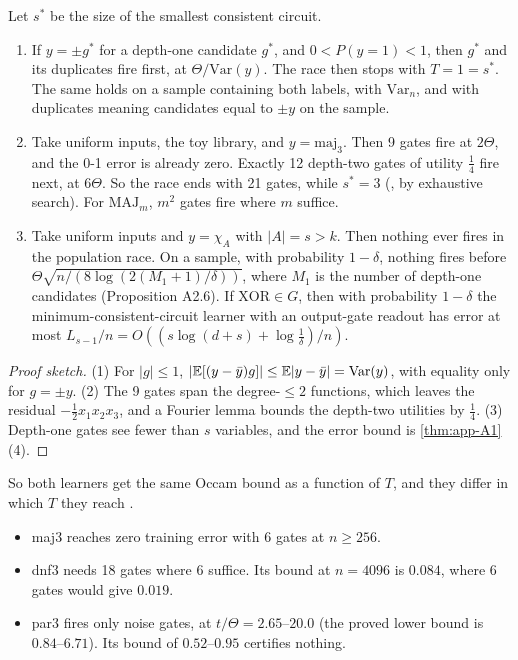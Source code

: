 \begin{proposition}\label{prop:app-A4}
\quad Let $s^*$ be the size of the smallest consistent circuit.
\begin{enumerate}[label=(\arabic*),nosep]
\item If $y=\pm g^*$ for a depth-one candidate $g^*$, and $0<P(y=1)<1$, then $g^*$ and its duplicates fire first, at $\Theta/\mathrm{Var}(y)$. The race then stops with $T=1=s^*$. The same holds on a sample containing both labels, with $\mathrm{Var}_n$, and with duplicates meaning candidates equal to $\pm y$ on the sample.
\item Take uniform inputs, the toy library, and $y=\mathrm{maj}_3$. Then 9 gates fire at $2\Theta$, and the 0-1 error is already zero. Exactly 12 depth-two gates of utility $\frac14$ fire next, at $6\Theta$. So the race ends with 21 gates, while $s^*=3$ (, by exhaustive search). For $\mathrm{MAJ}_m$, $m^2$ gates fire where $m$ suffice.
\item Take uniform inputs and $y=\chi_A$ with $|A|=s>k$. Then nothing ever fires in the population race. On a sample, with probability $1-\delta$, nothing fires before $\Theta\sqrt{n/(8\log(2(M_1+1)/\delta))}$, where $M_1$ is the number of depth-one candidates (Proposition A2.6). If $\mathrm{XOR}\in G$, then with probability $1-\delta$ the minimum-consistent-circuit learner with an output-gate readout has error at most $L_{s-1}/n=O((s\log(d+s)+\log\frac1\delta)/n)$.
\end{enumerate}
\end{proposition}
\begin{proof}[Proof sketch]
(1) For $|g|\le1$, $|\mathbb{E}[(y-\bar y)g]|\le\mathbb{E}|y-\bar y|=\mathrm{Var}(y)$, with equality only for $g=\pm y$. (2) The 9 gates span the degree-$\le2$ functions, which leaves the residual $-\frac12x_1x_2x_3$, and a Fourier lemma bounds the depth-two utilities by $\frac14$. (3) Depth-one gates see fewer than $s$ variables, and the error bound is \cref{thm:app-A1}(4).
\end{proof}
So both learners get the same Occam bound as a function of $T$, and they differ in which $T$ they reach .
\begin{itemize}[nosep]
\item maj3 reaches zero training error with 6 gates at $n\ge256$.
\item dnf3 needs 18 gates where 6 suffice. Its bound at $n=4096$ is $0.084$, where 6 gates would give $0.019$.
\item par3 fires only noise gates, at $t/\Theta=2.65$--$20.0$ (the proved lower bound is $0.84$--$6.71$). Its bound of $0.52$--$0.95$ certifies nothing.
\end{itemize}

